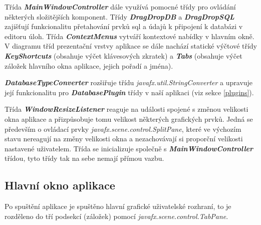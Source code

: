 \documentclass[czech,bachelor,public,dept460,male,cpdeclaration,twoside]{diploma}
\begin{document}
Třída \textbf{\emph{MainWindowController}} dále využívá pomocné třídy pro ovládání některých složitějších komponent. Třídy \textbf{\emph{DragDropDB}} a \textbf{\emph{DragDropSQL}} zajišťují funkcionalitu přetahování prvků sql a údajů k připojení k databázi v editoru úloh. Třída \textbf{\emph{ContextMenus}} vytváří kontextové nabídky v hlavním okně. V diagramu tříd prezentační vrstvy aplikace se dále nachází statické výčtové třídy \textbf{\emph{KeyShortcuts}} (obsahuje výčet klávesových zkratek) a \textbf{\emph{Tabs}} (obsahuje výčet záložek hlavního okna aplikace, jejich pořadí a jména).

\textbf{\emph{DatabaseTypeConverter}} rozšiřuje třídu \textit{javafx.util.StringConverter} a upravuje její funkcionalitu pro \textbf{\emph{DatabasePlugin}} třídy v naší aplikaci (viz sekce \ref{plugins}).

Třída \textbf{\emph{WindowResizeListener}} reaguje na události spojené s změnou velikosti okna aplikace a přizpůsobuje tomu velikost některých grafických prvků. Jedná se především o ovládací prvky \textit{javafx.scene.control.SplitPane}, které ve výchozím stavu nereagují na změny velikosti okna a nezachovávají si proporční velikosti nastavené uživatelem. Třída se inicializuje společně s \textbf{\emph{MainWindowController}} třídou, tyto třídy tak na sebe nemají přímou vazbu.

\newpage
\subsection{Hlavní okno aplikace}
Po spuštění aplikace je spuštěno hlavní grafické uživatelské rozhraní, to je rozděleno do tří podsekcí (záložek) pomocí \textit{javafx.scene.control.TabPane}.
\end{document}
